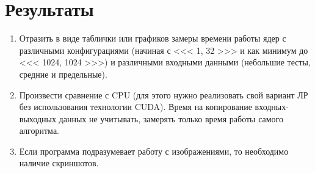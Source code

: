 \section{Результаты}
\begin{enumerate}[noitemsep, topsep=0pt]
	\item Отразить в виде таблички или графиков замеры времени работы ядер с различными конфигурациями (начиная с <{}<{}< 1, 32 >{}>{}> и как минимум до <{}<{}< 1024, 1024 >{}>{}>) и различными входными данными (небольшие тесты, средние и предельные). \\
	\item Произвести сравнение с CPU (для этого нужно реализовать свой вариант ЛР без использования технологии CUDA). Время на копирование входных-выходных данных не учитывать, замерять только время работы самого алгоритма. \\
	\item Если программа подразумевает работу с изображениями, то необходимо наличие скриншотов.
\end{enumerate}

